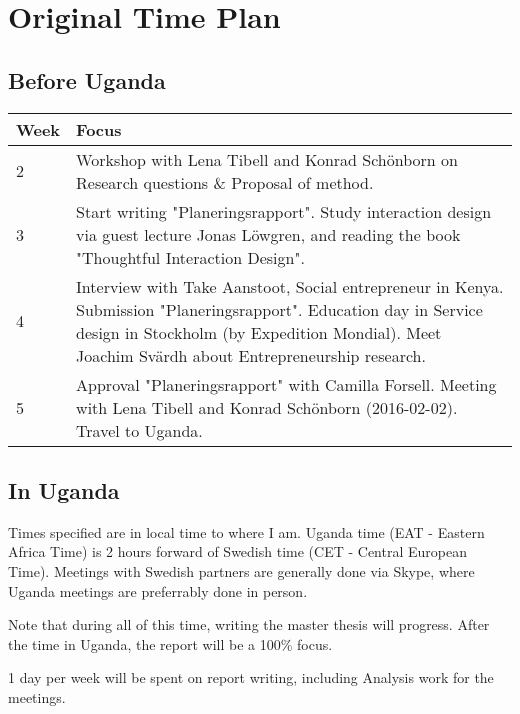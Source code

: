 \section{Original Time Plan}

\subsection{Before Uganda}

\begin{center}
    \begin{tabular}{ | l | p{10cm} |}
    \hline
    Week & Focus \\ \hline
    2 & Workshop with Lena Tibell and Konrad Schönborn on Research questions \& Proposal of method. \\ \hline 
    3 & Start writing "Planeringsrapport".
    Study interaction design 
    via guest lecture Jonas Löwgren,
    and reading the book "Thoughtful Interaction Design". \\ \hline
    4 & Interview with Take Aanstoot, Social entrepreneur in Kenya. Submission "Planeringsrapport". Education day in Service design in Stockholm (by Expedition Mondial). Meet Joachim Svärdh about Entrepreneurship research. \\ \hline
    5 & Approval "Planeringsrapport" with Camilla Forsell. Meeting with Lena Tibell and Konrad Schönborn (2016-02-02). Travel to Uganda. \\ \hline
    
    \end{tabular}
\end{center}

\subsection{In Uganda}

Times specified are in local time to where I am. Uganda time (EAT - Eastern Africa Time) is 2 hours forward of Swedish time (CET - Central European Time). Meetings with Swedish partners are generally done via Skype, where Uganda meetings are preferrably done in person. 

Note that during all of this time, writing the master thesis will progress. After the time in Uganda, the report will be a 100\% focus.

1 day per week will be spent on report writing, including Analysis work for the meetings.


